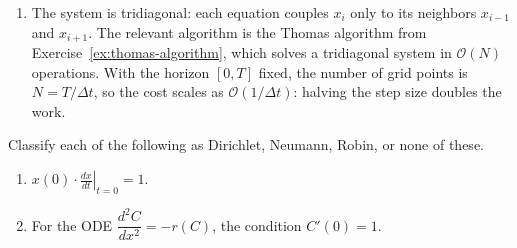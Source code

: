 \begin{solution}
\begin{enumerate}[label=(\alph*)]
        \item The system is tridiagonal: each equation couples $x_i$
        only to its neighbors $x_{i-1}$ and $x_{i+1}$.  The relevant
        algorithm is the Thomas algorithm from
        Exercise~\ref{ex:thomas-algorithm}, which solves a tridiagonal
        system in $\mathcal{O}(N)$ operations.  With the horizon
        $[0, T]$ fixed, the number of grid points is $N = T/\Delta t$,
        so the cost scales as $\mathcal{O}(1/\Delta t)$: halving the
        step size doubles the work.

    \end{enumerate}
\end{solution}

%

\begin{exercise} %
    Classify each of the following as Dirichlet, Neumann, Robin, or none of these.
    \begin{enumerate}[label=(\alph*)]
        \item $\displaystyle x(0)\cdot\left.\frac{dx}{dt}\right|_{t=0} = 1$.
        \item For the ODE $\dfrac{d^2C}{dx^2} = -r(C)$, the condition $C'(0) = 1$.
    \end{enumerate}
\end{exercise}

